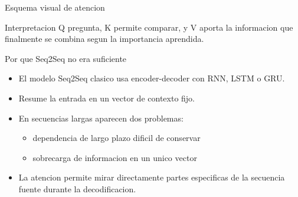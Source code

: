 \documentclass[aspectratio=169]{beamer}
\begin{document}
\begin{frame}{Esquema visual de atencion}
  \centering
  \vspace{0.25cm}

  \begin{block}{Interpretacion}
    Q pregunta, K permite comparar, y V aporta la informacion que finalmente se combina segun la importancia aprendida.
  \end{block}
\end{frame}

\begin{frame}{Por que Seq2Seq no era suficiente}
  \begin{itemize}
    \item El modelo Seq2Seq clasico usa encoder-decoder con RNN, LSTM o GRU.
    \item Resume la entrada en un vector de contexto fijo.
    \item En secuencias largas aparecen dos problemas:
      \begin{itemize}
        \item dependencia de largo plazo dificil de conservar
        \item sobrecarga de informacion en un unico vector
      \end{itemize}
    \item La atencion permite mirar directamente partes especificas de la secuencia fuente durante la decodificacion.
  \end{itemize}
\end{frame}
\end{document}
